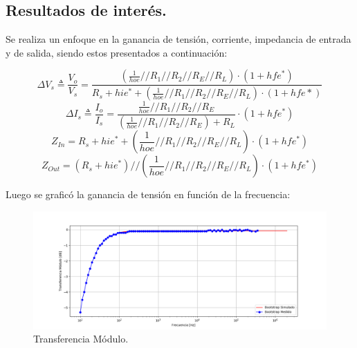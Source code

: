 \subsection{Resultados de interés.}
Se realiza un enfoque en la ganancia de tensión, corriente, impedancia de entrada y de salida, siendo estos presentados a continuación:

\begin{equation}
	\Delta V_s \triangleq \frac{V_o}{V_s} = \frac{ \left(\frac{1}{hoe} // R_1 // R_2 // R_E // R_L  \right)\cdot (1+hfe^*)}{R_s + hie^* + \left(\frac{1}{hoe} // R_1 // R_2 // R_E // R_L  \right)\cdot (1+hfe*) } 
\end{equation}
\begin{equation}
	\Delta I_s \triangleq \frac{I_o}{I_s} =  \frac{\frac{1}{hoe} // R_1 // R_2 // R_E}{(\frac{1}{hoe} // R_1 // R_2 // R_E)+R_L} \cdot (1+hfe^*)
\end{equation}
\begin{equation}
	Z_{In} = R_s + hie^* + \left(\frac{1}{hoe} // R_1 // R_2 // R_E // R_L  \right)\cdot (1+hfe^*)
\end{equation}
\begin{equation}
	Z_{Out} = (R_s + hie^*) //  \left(\frac{1}{hoe} // R_1 // R_2 // R_E // R_L  \right)\cdot (1+hfe^*)
\end{equation}

Luego se graficó la ganancia de tensión en función de la frecuencia:
\begin{figure} [H]
	\centering
	\includegraphics[width=\textwidth]{imagenes/avs.png}
	\caption{Transferencia Módulo.}
	\label{fig:transmod}
\end{figure}


